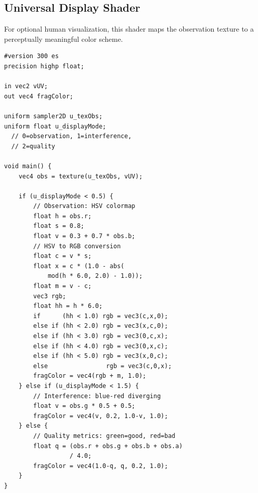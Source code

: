 \documentclass[11pt,twocolumn,a4paper]{article}
\begin{document}
\subsection{Universal Display Shader}

For optional human visualization, this shader maps the observation
texture to a perceptually meaningful color scheme.

\begin{lstlisting}[style=glsl,caption={Universal Display Shader}]
#version 300 es
precision highp float;

in vec2 vUV;
out vec4 fragColor;

uniform sampler2D u_texObs;
uniform float u_displayMode;
  // 0=observation, 1=interference,
  // 2=quality

void main() {
    vec4 obs = texture(u_texObs, vUV);

    if (u_displayMode < 0.5) {
        // Observation: HSV colormap
        float h = obs.r;
        float s = 0.8;
        float v = 0.3 + 0.7 * obs.b;
        // HSV to RGB conversion
        float c = v * s;
        float x = c * (1.0 - abs(
            mod(h * 6.0, 2.0) - 1.0));
        float m = v - c;
        vec3 rgb;
        float hh = h * 6.0;
        if      (hh < 1.0) rgb = vec3(c,x,0);
        else if (hh < 2.0) rgb = vec3(x,c,0);
        else if (hh < 3.0) rgb = vec3(0,c,x);
        else if (hh < 4.0) rgb = vec3(0,x,c);
        else if (hh < 5.0) rgb = vec3(x,0,c);
        else                rgb = vec3(c,0,x);
        fragColor = vec4(rgb + m, 1.0);
    } else if (u_displayMode < 1.5) {
        // Interference: blue-red diverging
        float v = obs.g * 0.5 + 0.5;
        fragColor = vec4(v, 0.2, 1.0-v, 1.0);
    } else {
        // Quality metrics: green=good, red=bad
        float q = (obs.r + obs.g + obs.b + obs.a)
                  / 4.0;
        fragColor = vec4(1.0-q, q, 0.2, 1.0);
    }
}
\end{lstlisting}



\end{document}

